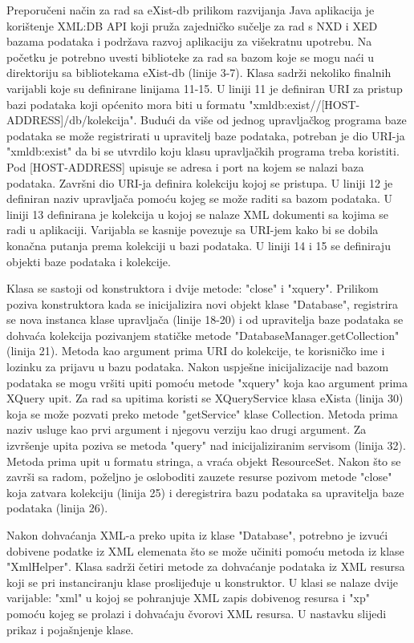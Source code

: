 \documentclass{foi}
\begin{document}
Preporučeni način za rad sa eXist-db prilikom razvijanja Java aplikacija je korištenje XML:DB API koji pruža zajedničko sučelje za rad s NXD i XED bazama podataka i podržava razvoj aplikaciju za višekratnu upotrebu. Na početku je potrebno uvesti biblioteke za rad sa bazom koje se mogu naći u direktoriju sa bibliotekama eXist-db (linije 3-7).  Klasa sadrži nekoliko finalnih varijabli koje su definirane linijama 11-15. U liniji 11 je definiran URI za pristup bazi podataka koji općenito mora biti u formatu "xmldb:exist//[HOST-ADDRESS]/db/kolekcija". Budući da više od jednog upravljačkog programa baze podataka se može registrirati u upravitelj baze podataka, potreban je dio URI-ja "xmldb:exist" da bi se utvrdilo koju klasu upravljačkih programa treba koristiti. Pod [HOST-ADDRESS] upisuje se adresa i port na kojem se nalazi baza podataka. Završni dio URI-ja definira kolekciju kojoj se pristupa. \cite{existdb-java} U liniji 12 je definiran naziv upravljača pomoću kojeg se može raditi sa bazom podataka. U liniji 13 definirana je kolekcija u kojoj se nalaze XML dokumenti sa kojima se radi u aplikaciji. Varijabla se kasnije povezuje sa URI-jem kako bi se dobila konačna putanja prema kolekciji u bazi podataka. U liniji 14 i 15 se definiraju objekti baze podataka i kolekcije.

Klasa se sastoji od konstruktora i dvije metode: "close" i "xquery". Prilikom poziva konstruktora kada se inicijalizira novi objekt klase "Database", registrira se nova instanca klase upravljača (linije 18-20) i od upravitelja baze podataka se dohvaća kolekcija pozivanjem statičke metode "DatabaseManager.getCollection" (linija 21). Metoda kao argument prima URI do kolekcije, te korisničko ime i lozinku za prijavu u bazu podataka. Nakon uspješne inicijalizacije nad bazom podataka se mogu vršiti upiti pomoću metode "xquery" koja kao argument prima XQuery upit.  Za rad sa upitima koristi se XQueryService klasa eXista (linija 30) koja se može pozvati preko metode "getService" klase Collection. Metoda prima naziv usluge kao prvi argument i njegovu verziju kao drugi argument.  Za izvršenje upita poziva se metoda "query" nad inicijaliziranim servisom (linija 32). Metoda prima upit u formatu stringa, a vraća objekt ResourceSet. Nakon što se završi sa radom, poželjno je osloboditi zauzete resurse pozivom metode "close" koja zatvara kolekciju (linija 25) i deregistrira bazu podataka sa upravitelja baze podataka (linija 26).

Nakon dohvaćanja XML-a preko upita iz klase "Database", potrebno je izvući dobivene podatke iz XML elemenata što se može učiniti pomoću metoda iz klase "XmlHelper". Klasa sadrži četiri metode za dohvaćanje podataka iz XML resursa koji se pri instanciranju klase proslijeđuje u konstruktor. U klasi se nalaze dvije varijable: "xml" u kojoj se pohranjuje XML zapis dobivenog resursa i "xp" pomoću kojeg se prolazi i dohvaćaju čvorovi XML resursa. U nastavku slijedi prikaz i pojašnjenje klase.
\end{document}
